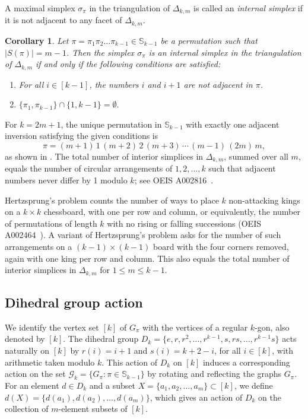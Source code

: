 \documentclass{birkjour}
\newtheorem{cor}[thm]{Corollary}
\theoremstyle{definition}
\theoremstyle{remark}
\numberwithin{equation}{section}
\begin{document}
A maximal simplex $\sigma_\pi$ in the triangulation of
$\Delta_{k,m}$ is called an \emph{internal simplex} if it is not
adjacent to any facet of $\Delta_{k,m}$.
\begin{cor} Let
$\pi=\pi_1\pi_2\ldots\pi_{k-1}\in \mathbb{S}_{k-1}$ be a
permutation such that $|S(\pi)|=m-1$. Then the simplex
$\sigma_\pi$ is an internal simplex in the triangulation of
$\Delta_{k,m}$ if and only if the following conditions are
satisfied:
\begin{enumerate}
    \item For all $i\in [k-1]$, the numbers
    $i$ and $i+1$ are not adjacent in $\pi$.
    \item $\{\pi_1,\pi_{k-1}\}\cap \{1,k-1\}=\emptyset.$
\end{enumerate}

\end{cor}

For $ k = 2m + 1$, the unique permutation in $ \mathbb{S}_{k-1}$
with exactly one adjacent inversion satisfying the given
conditions is
$$
\pi = (m+1)\,1\, (m+2)\, 2\, (m+3)\, \cdots\, (m-1)\, (2m)\, m,
$$
as shown in \cite{Lam}. The total number of interior simplices in
$\Delta_{k,m}$, summed over all $m$, equals the number of circular
arrangements of $ 1,2,\ldots,k $ such that adjacent numbers never
differ by 1 modulo $k$; see OEIS A002816~\cite{Sloan}.

Hertzsprung's problem counts the number of ways to place $k$
non-attacking kings on a $k \times k$ chessboard, with one per row
and column, or equivalently, the number of permutations of length
$k $ with no rising or falling successions (OEIS
A002464~\cite{Sloan}). A variant of Hertzsprung's problem asks for
the number of such arrangements on a $ (k{-}1)\times(k{-}1)$ board
with the four corners removed, again with one king per row and
column. This also equals the total number of interior simplices in
$\Delta_{k,m} $ for $ 1 \leq m \leq k{-}1$.



\subsection{Dihedral group action}

We identify the vertex set $[k]$ of $G_{\pi}$ with the vertices of
a regular $k$-gon, also denoted by $[k]$. The dihedral group
$D_k=\{e,r,r^2,\ldots,r^{k-1},s,rs,\ldots,r^{k-1}s\}$ acts
naturally on $[k]$ by $r(i)=i+1$ and $s(i)=k+2-i$, for all $i\in
[k]$, with arithmetic taken modulo $k$. This action of $D_k$ on
$[k]$ induces a corresponding action on the set
$\mathcal{G}_k=\{G_\pi:\pi \in \mathbb{S}_{k-1}\}$ by rotating and
reflecting the graphs $G_\pi$. For an element $d\in D_k$ and a
subset $X=\{a_1,a_2,\ldots,a_m\}\subset [k]$, we define
$d(X)=\{d(a_1),d(a_2),\ldots,d(a_m)\}$, which gives an action of
$D_k$ on the collection of $m$-element subsets of $[k]$.
\end{document}
